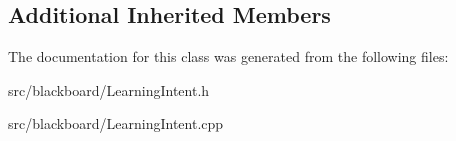 \subsection*{Additional Inherited Members}


The documentation for this class was generated from the following files\+:\begin{DoxyCompactItemize}
\item 
src/blackboard/Learning\+Intent.\+h\item 
src/blackboard/Learning\+Intent.\+cpp\end{DoxyCompactItemize}
